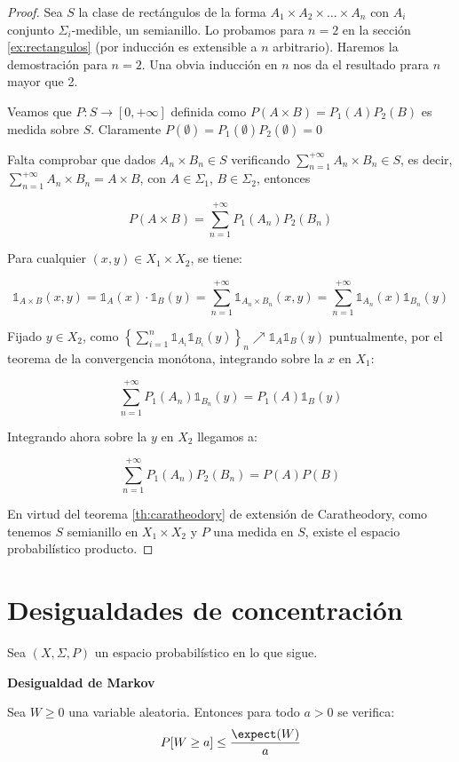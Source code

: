 \begin{proof}
 Sea $S$ la clase de rectángulos de la forma $A_1 \times A_2 \times \ldots \times A_n$ con $A_i$ conjunto 
 $\Sigma_i$-medible, un semianillo. Lo probamos para $n=2$ en la sección \ref{ex:rectangulos} (por inducción es 
 extensible a $n$ arbitrario). Haremos la demostración para $n=2$. Una obvia inducción en $n$ nos da el 
 resultado prara $n$ mayor que 2.
 
 Veamos que $P:S \rightarrow [0,+\infty]$ definida como $P(A\times B) = P_1(A) P_2(B)$ es medida sobre $S$.
 Claramente $P(\emptyset) = P_1(\emptyset)P_2(\emptyset) = 0$
 
 Falta comprobar que dados $A_n \times B_n \in S$ verificando $\sum_{n=1}^{+\infty} A_n\times B_n \in S$,
 es decir, $\sum_{n=1}^{+\infty} A_n\times B_n = A\times B$, con $A \in \Sigma_1$, $B \in \Sigma_2$, entonces
 
 \[P(A\times B) = \sum_{n=1}^{+\infty} P_1(A_n) P_2(B_n)\]
 
 Para cualquier $(x,y) \in X_1 \times X_2$, se tiene:
 
 \[\mathds{1}_{A\times B}(x,y) = \mathds{1}_{A}(x)\cdot \mathds{1}_B(y) = \sum_{n=1}^{+\infty} 
 \mathds{1}_{A_n\times B_n}(x,y) = \sum_{n=1}^{+\infty} \mathds{1}_{A_n}(x) \mathds{1}_{B_n}(y) \] 
 
 Fijado $y\in X_2$, como $\left\{\sum_{i=1}^{n} \mathds{1}_{A_i}\mathds{1}_{B_i}(y)\right\}_n \nearrow \mathds{1}_A \mathds{1}_B(y)$ 
 puntualmente, por el teorema de la convergencia monótona, integrando sobre la $x$ en $X_1$:
 
 \[\sum_{n=1}^{+\infty} P_1(A_n)\mathds{1}_{B_n}(y) = P_1(A) \mathds{1}_B(y)\]
 
 Integrando ahora sobre la $y$ en $X_2$ llegamos a:
 
 \[\sum_{n=1}^{+\infty} P_1(A_n) P_2(B_n) = P(A) P(B)\]
 
 En virtud del teorema \ref{th:caratheodory} de extensión de Caratheodory, como tenemos $S$ semianillo en 
 $X_1\times X_2$ y $P$ una medida en $S$, existe el espacio probabilístico producto.
\end{proof}

\section{Desigualdades de concentración}
Sea $(X,\Sigma,P)$ un espacio probabilístico en lo que sigue.

\begin{lemma} \textbf{Desigualdad de Markov}

Sea $W \ge 0$ una variable aleatoria. Entonces para todo $a > 0$ se verifica:
\[P[W \ge a] \le \frac{\expect(W)}{a}\]

\label{ineq:markov}
\end{lemma}

